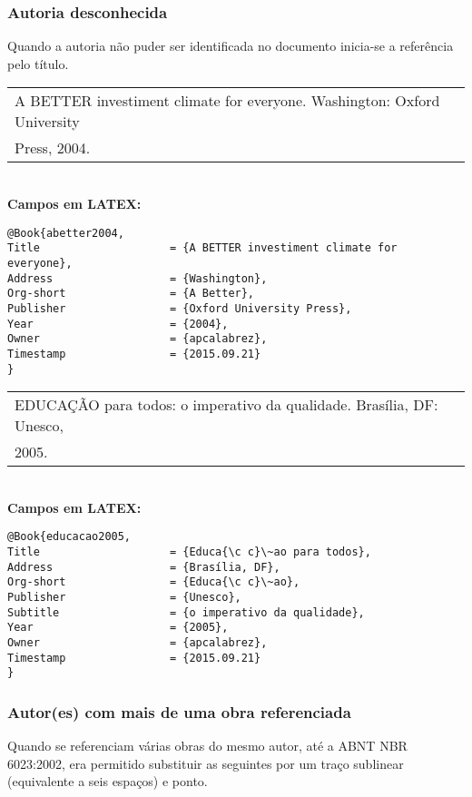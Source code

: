 \subsubsection{Autoria desconhecida} 

Quando a autoria não puder ser identificada no documento inicia-se a referência pelo título.

\begin{tabular}{|l|c|} \hline
	A BETTER investiment climate for everyone. Washington: Oxford University \\ Press, 2004.\\\hline
\end{tabular}\\

\textbf{Campos em LATEX:}

\begin{verbatim}
@Book{abetter2004,
Title                    = {A BETTER investiment climate for everyone},
Address                  = {Washington},
Org-short                = {A Better},
Publisher                = {Oxford University Press},
Year                     = {2004},
Owner                    = {apcalabrez},
Timestamp                = {2015.09.21}
}
\end{verbatim}

\begin{tabular}{|l|c|} \hline
	EDUCAÇÃO para todos: o imperativo da qualidade. Brasília, DF: Unesco,\\ 2005.\\\hline
\end{tabular}\\

\textbf{Campos em LATEX:}

\begin{verbatim}
@Book{educacao2005,
Title                    = {Educa{\c c}\~ao para todos},
Address                  = {Brasília, DF},
Org-short                = {Educa{\c c}\~ao},
Publisher                = {Unesco},
Subtitle                 = {o imperativo da qualidade},
Year                     = {2005},
Owner                    = {apcalabrez},
Timestamp                = {2015.09.21}
}
\end{verbatim}

\subsubsection{Autor(es) com mais de uma obra referenciada } 

Quando se referenciam várias obras do mesmo autor, até a ABNT NBR 6023:2002, era permitido substituir as seguintes por um traço sublinear (equivalente a seis espaços) e ponto.

